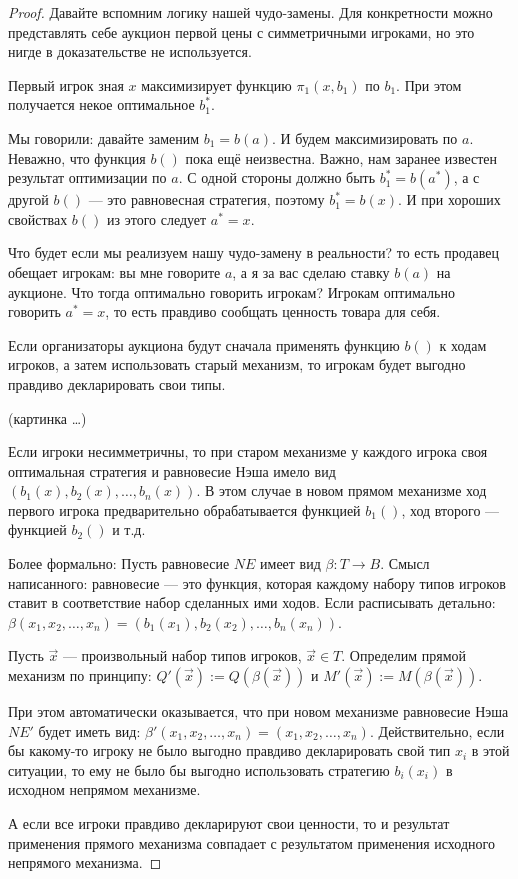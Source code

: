 \begin{proof}
Давайте вспомним логику нашей чудо-замены. Для конкретности можно представлять себе аукцион первой цены с симметричными игроками, но это нигде в доказательстве не используется.

Первый игрок зная $ x $ максимизирует функцию $ \pi_{1}(x,b_{1}) $ по $ b_{1} $. При этом получается некое оптимальное $ b_{1}^{*} $.

Мы говорили: давайте заменим $ b_{1}=b(a) $. И будем максимизировать по $ a $. Неважно, что функция $ b() $ пока ещё неизвестна. Важно, нам заранее известен результат оптимизации по $ a $. С одной стороны должно быть $ b_{1}^{*}=b(a^{*})$, а с другой $ b() $ — это равновесная стратегия, поэтому $ b_{1}^{*}=b(x) $. И при хороших свойствах $ b() $ из этого следует   $ a^{*}=x $.

Что будет если мы реализуем нашу чудо-замену в реальности? то есть продавец обещает игрокам: вы мне говорите $ a $, а я за вас сделаю ставку $ b(a) $ на аукционе. Что тогда оптимально говорить игрокам? Игрокам оптимально говорить $ a^{*}=x $, то есть правдиво сообщать ценность товара для себя.

Если организаторы аукциона будут сначала применять функцию $ b() $ к ходам игроков, а затем использовать старый механизм, то игрокам будет выгодно правдиво декларировать свои типы.

(картинка \ldots)


Если игроки несимметричны, то при старом механизме у каждого игрока своя оптимальная стратегия и равновесие Нэша имело вид $ (b_{1}(x),b_{2}(x),\ldots,b_{n}(x)) $. В этом случае в новом прямом механизме ход первого игрока предварительно обрабатывается функцией $ b_{1}() $, ход второго — функцией $ b_{2}() $ и т.д.

Более формально: Пусть равновесие $ NE $ имеет вид $ \beta: T\to B $. Смысл написанного: равновесие — это функция, которая каждому набору типов игроков ставит в соответствие набор сделанных ими ходов. Если расписывать детально: $ \beta(x_{1},x_{2},\ldots,x_{n})=(b_{1}(x_{1}),b_{2}(x_{2}),\ldots,b_{n}(x_{n})) $.

Пусть $ \vec{x} $ — произвольный набор типов игроков, $ \vec{x}\in T $. Определим прямой механизм по принципу: $ Q'(\vec{x}):=Q(\beta(\vec{x})) $ и
$ M'(\vec{x}):=M(\beta(\vec{x}))  $.

При этом автоматически оказывается, что при новом механизме равновесие Нэша $ NE' $ будет иметь вид: $ \beta'(x_{1},x_{2},\ldots,x_{n})=(x_{1},x_{2},\ldots,x_{n}) $. Действительно, если бы какому-то игроку  не было выгодно правдиво декларировать свой тип $ x_{i} $ в этой ситуации, то ему не было бы выгодно использовать стратегию $ b_{i}(x_{i}) $ в исходном непрямом механизме.

А если все игроки правдиво декларируют свои ценности, то и результат применения прямого механизма совпадает с результатом применения исходного непрямого механизма.
\end{proof}

